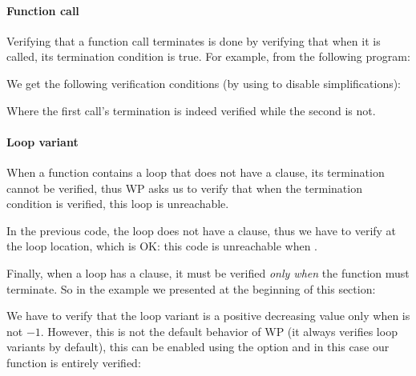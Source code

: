 

\paragraph{Function call}


Verifying that a function call terminates is done by verifying that when it is
called, its termination condition is true. For example, from the following
program:




We get the following verification conditions (by using 
to disable simplifications):






Where the first call's termination is indeed verified while the second is not.


\paragraph{Loop variant}


When a function contains a loop that does not have a 
clause, its termination cannot be verified, thus WP asks us to verify that when
the termination condition is verified, this loop is unreachable.




In the previous code, the loop does not have a 
clause, thus we have to verify 
at the loop location, which is OK: this code is unreachable when
.


Finally, when a loop has a  clause, it must be
verified {\em only when} the function must terminate. So in the example
we presented at the beginning of this section:




We have to verify that the loop variant is a positive decreasing value only
when  is not $-1$. However, this is not the default
behavior of WP (it always verifies loop variants by default), this can
be enabled using the option  and
in this case our function is entirely verified:




